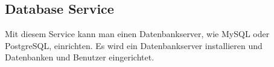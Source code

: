 \subsection{Database Service}

Mit diesem Service kann man einen Datenbankserver, wie MySQL oder PostgreSQL,
einrichten. Es wird ein Datenbankserver installieren und Datenbanken
und Benutzer eingerichtet.



